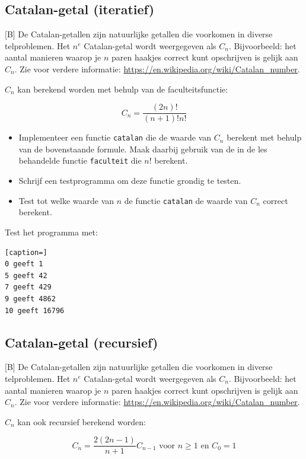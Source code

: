 \documentclass[a4paper,10pt,fleqn,twoside]{article}
\begin{document}
\subsection{Catalan-getal (iteratief)}[B]
De Catalan-getallen zijn natuurlijke getallen die voorkomen in diverse telproblemen. Het $n^e$ Catalan-getal wordt weergegeven als $C_n$. Bijvoorbeeld: het aantal manieren waarop je $n$ paren haakjes correct kunt opschrijven is gelijk aan $C_n$. Zie voor verdere informatie: \url{https://en.wikipedia.org/wiki/Catalan_number}.

$C_n$ kan berekend worden met behulp van de faculteitsfunctie: 

\begin{equation*}
C_n = \dfrac{(2n)!}{(n+1)!n!}
\end{equation*}

\begin{itemize}
\item Implementeer een functie \lstinline|catalan| die de waarde van $C_n$ berekent met behulp van de bovenstaande formule. Maak daarbij gebruik van de in de les behandelde functie \lstinline|faculteit| die $n!$ berekent.
\item Schrijf een testprogramma om deze functie grondig te testen.
\item Test tot welke waarde van $n$ de functie \lstinline|catalan| de waarde van $C_n$ correct berekent.
\end{itemize}

Test het programma met:

\begin{lstlisting}[caption=]
0 geeft 1
5 geeft 42
7 geeft 429
9 geeft 4862
10 geeft 16796
\end{lstlisting}

\subsection{Catalan-getal (recursief)}[B]
De Catalan-getallen zijn natuurlijke getallen die voorkomen in diverse telproblemen. Het $n^e$ Catalan-getal wordt weergegeven als $C_n$. Bijvoorbeeld: het aantal manieren waarop je $n$ paren haakjes correct kunt opschrijven is gelijk aan $C_n$. Zie voor verdere informatie: \url{https://en.wikipedia.org/wiki/Catalan_number}.

$C_n$ kan ook recursief berekend worden:

\begin{equation*}
C_n = \dfrac{2(2n-1)}{n+1}C_{n-1} \text{ voor } n \geq 1 \text{ en } C_0=1
\end{equation*}
\end{document}
